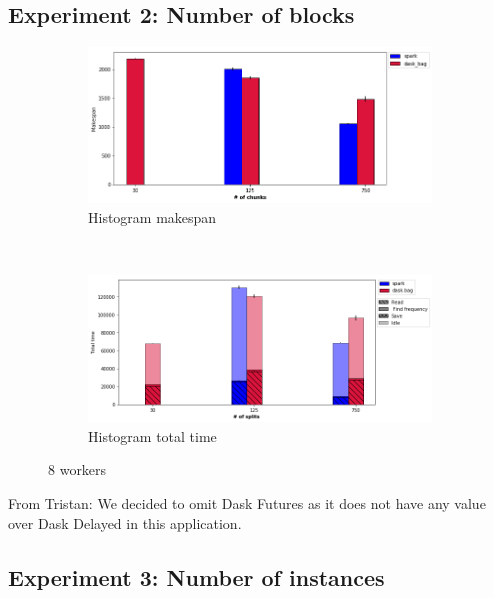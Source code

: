 \documentclass[conference]{IEEEtran}
\newcommand{\TG}[1]{\color{cyan}From Tristan: #1 \color{black}}
\begin{document}
\subsection{Experiment 2: Number of blocks}

\begin{figure}[!t]
    \centering
    \begin{subfigure}[b]{\columnwidth}
        \includegraphics[clip,width=\columnwidth]{images/histo_splits.png}%
        \caption{Histogram makespan}\label{fig:histo_ms_block}
    \end{subfigure}
    \\
    \begin{subfigure}[b]{\columnwidth}
        \includegraphics[clip,width=\columnwidth]{images/histo_idle_splits.png}%
        \caption{Histogram total time}\label{fig:histo_tt_block}
    \end{subfigure}
    \caption{8 workers}
\end{figure}
\TG{We decided to omit Dask Futures as it does not have any value over Dask
Delayed in this application.}
\subsection{Experiment 3: Number of instances}



\end{document}
